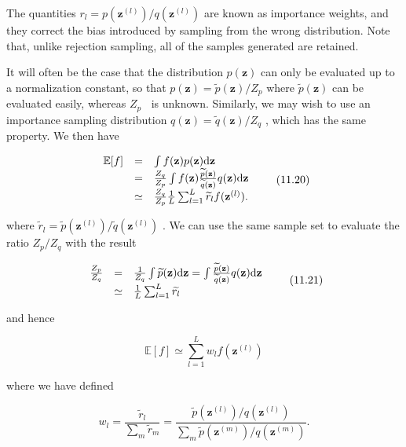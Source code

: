 \documentclass[
  10
]{article}
\begin{document}
The quantities
\(r _ { l } = p ( \mathbf { z } ^ { ( l ) } ) / q ( \mathbf { z } ^ { ( l ) } )\)
are known as importance weights, and they correct the bias introduced by
sampling from the wrong distribution. Note that, unlike rejection
sampling, all of the samples generated are retained.

It will often be the case that the distribution \(p ( \mathbf { z } )\)
can only be evaluated up to a normalization constant, so that
\(p ( \mathbf { z } ) = \widetilde { p } ( \mathbf { z } ) / Z _ { p }\)
where \(\widetilde { p } ( \mathbf { z } )\) can be evaluated easily,
whereas \(Z _ { p }\)  is unknown. Similarly, we may wish to use an
importance sampling distribution
\(q ( \mathbf { z } ) = \widetilde { q } ( \mathbf { z } ) / Z _ { q }\)
, which has the same property. We then have

\[
\begin{array}{r c l} \mathbb {E} [ f ] & = & \int f (\mathbf {z}) p (\mathbf {z}) \mathrm{d} \mathbf {z} \\ & = & \frac {Z _ {q}}{Z _ {p}} \int f (\mathbf {z}) \frac {\widetilde {p} (\mathbf {z})}{\widetilde {q} (\mathbf {z})} q (\mathbf {z}) \mathrm{d} \mathbf {z} \\ & \simeq & \frac {Z _ {q}}{Z _ {p}} \frac {1}{L} \sum_ {l = 1} ^ {L} \widetilde {r} _ {l} f (\mathbf {z} ^ {(l)}). \end{array}\tag{11.20}
\]

where
\(\widetilde { r } _ { l } = \widetilde { p } ( \mathbf { z } ^ { ( l ) } ) / \widetilde { q } ( \mathbf { z } ^ { ( l ) } )\)
. We can use the same sample set to evaluate the ratio
\(Z _ { p } / Z _ { q }\) with the result

\[
\begin{array}{r c l} \frac {Z _ {p}}{Z _ {q}} & = & \frac {1}{Z _ {q}} \int \widetilde {p} (\mathbf {z}) \mathrm{d} \mathbf {z} = \int \frac {\widetilde {p} (\mathbf {z})}{\widetilde {q} (\mathbf {z})} q (\mathbf {z}) \mathrm{d} \mathbf {z} \\ & \simeq & \frac {1}{L} \sum_ {l = 1} ^ {L} \widetilde {r _ {l}} \end{array}\tag{11.21}
\]

and hence

\[
\mathbb {E} [ f ] \simeq \sum_ {l = 1} ^ {L} w _ {l} f (\mathbf {z} ^ {(l)})\tag{11.22}
\]

where we have defined

\[
w _ {l} = \frac {\widetilde {r} _ {l}}{\sum_ {m} \widetilde {r} _ {m}} = \frac {\widetilde {p} (\mathbf {z} ^ {(l)}) / q (\mathbf {z} ^ {(l)})}{\sum_ {m} \widetilde {p} (\mathbf {z} ^ {(m)}) / q (\mathbf {z} ^ {(m)})}.\tag{11.23}
\]
\end{document}
